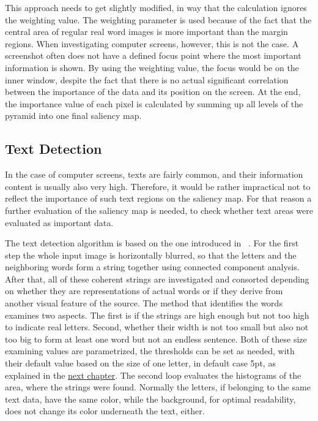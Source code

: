 \documentclass[draft,final]{vutinfth} %
\begin{document}
	This approach needs to get slightly modified, in way that the calculation ignores the weighting value.
	The weighting parameter is used because of the fact that the central area of regular real word images is more important than the margin regions.
	When investigating computer screens, however, this is not the case.
	A screenshot often does not have a defined focus point where the most important information is shown.
	By using the weighting value, the focus would be on the inner window, despite the fact that there is no actual significant correlation between the importance of the data and its position on the screen.
	At the end, the importance value of each pixel is calculated by summing up all levels of the pyramid into one final saliency map.\par
	
	\subsection{Text Detection}
	In the case of computer screens, texts are fairly common, and their information content is usually also very high.
	Therefore, it would be rather impractical not to reflect the importance of such text regions on the saliency map. 
	For that reason a further evaluation of the saliency map is needed, to check whether text areas were evaluated as important data.\par 
	The text detection algorithm is based on the one introduced in ~\cite{chang2011associating}.
	For the first step the whole input image is horizontally blurred, so that the letters and the neighboring words form a string together using connected component analysis.
	After that, all of these coherent strings are investigated and consorted depending on whether they are representations of actual words or if they derive from another visual feature of the source.
	The method that identifies the words examines two aspects.
	The first is if the strings are high enough but not too high to indicate real letters.
	Second, whether their width is not too small but also not too big to form at least one word but not an endless sentence.
	Both of these size examining values are parametrized, the thresholds can be set as needed, with their default value based on the size of one letter, in default case 5pt, as explained in the \hyperref[Implementation]{next chapter}. 
	The second loop evaluates the histograms of the area, where the strings were found.
	Normally the letters, if belonging to the same text data, have the same color, while the background, for optimal readability, does not change its color underneath the text, either.
\end{document}
